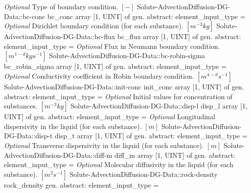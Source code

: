 \begin{RecordType}
			{ \it{Optional}}
			{{{Type of boundary condition. }{$[-]$}%
}}
		\RecKey
			{Solute-AdvectionDiffusion-DG-Data::bc-conc}
			{bc{\_}conc}
			{{array [1, UINT] of }{gen. abstract: }}{{element{\_}input{\_}type}{ = }}
			{ \it{Optional}}
			{{{Dirichlet boundary condition (for each substance). }{$[m^{-3}kg]$}%
}}
		\RecKey
			{Solute-AdvectionDiffusion-DG-Data::bc-flux}
			{bc{\_}flux}
			{{array [1, UINT] of }{gen. abstract: }}{{element{\_}input{\_}type}{ = }}
			{ \it{Optional}}
			{{{Flux in Neumann boundary condition. }{$[m^{1-d}kgs^{-1}]$}%
}}
		\RecKey
			{Solute-AdvectionDiffusion-DG-Data::bc-robin-sigma}
			{bc{\_}robin{\_}sigma}
			{{array [1, UINT] of }{gen. abstract: }}{{element{\_}input{\_}type}{ = }}
			{ \it{Optional}}
			{{{Conductivity coefficient in Robin boundary condition. }{$[m^{4-d}s^{-1}]$}%
}}
		\RecKey
			{Solute-AdvectionDiffusion-DG-Data::init-conc}
			{init{\_}conc}
			{{array [1, UINT] of }{gen. abstract: }}{{element{\_}input{\_}type}{ = }}
			{ \it{Optional}}
			{{{Initial values for concentration of substances. }{$[m^{-3}kg]$}%
}}
		\RecKey
			{Solute-AdvectionDiffusion-DG-Data::disp-l}
			{disp{\_}l}
			{{array [1, UINT] of }{gen. abstract: }}{{element{\_}input{\_}type}{ = }}
			{ \it{Optional}}
			{{{Longitudinal dispersivity in the liquid (for each substance). }{$[m]$}%
}}
		\RecKey
			{Solute-AdvectionDiffusion-DG-Data::disp-t}
			{disp{\_}t}
			{{array [1, UINT] of }{gen. abstract: }}{{element{\_}input{\_}type}{ = }}
			{ \it{Optional}}
			{{{Transverse dispersivity in the liquid (for each substance). }{$[m]$}%
}}
		\RecKey
			{Solute-AdvectionDiffusion-DG-Data::diff-m}
			{diff{\_}m}
			{{array [1, UINT] of }{gen. abstract: }}{{element{\_}input{\_}type}{ = }}
			{ \it{Optional}}
			{{{Molecular diffusivity in the liquid (for each substance). }{$[m^{2}s^{-1}]$}%
}}
		\RecKey
			{Solute-AdvectionDiffusion-DG-Data::rock-density}
			{rock{\_}density}
			{{gen. abstract: }}{{element{\_}input{\_}type}{ = }}

\end{RecordType}
